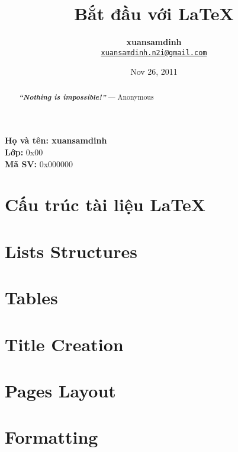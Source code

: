 \documentclass[11pt,a4paper]{article}
\title{\textbf{\huge{Bắt đầu với \LaTeX}}}
\author{\textbf{xuansamdinh}\\
\texttt{\underline{xuansamdinh.n2i@gmail.com}}}
\date{Nov 26, 2011}
\begin{document}
\maketitle
\begin{flushleft}
	\textbf{Họ và tên: xuansamdinh}\\
	\textbf{Lớp:} 0x00\\
	\textbf{Mã SV:} 0x000000
\end{flushleft}
\pagebreak
\renewcommand{\abstractname}{--- Philosophy ---}
\begin{abstract}
\begin{center}
\textbf{\emph{``Nothing is impossible!''}} --- Anonymous
\end{center}
\end{abstract}
\pagebreak
\renewcommand{\contentsname}{\underline{NỘI DUNG}}
\tableofcontents
\listoftables
\pagebreak


\newpage
\part{Cấu trúc tài liệu \LaTeX{}}



\newpage


\part{Lists Structures}
%

\newpage

\part{Tables}


\newpage

\part{Title Creation}


\newpage

\part{Pages Layout}


\newpage

\part{Formatting}
%

\newpage
{}

\nocite{*}
%

\end{document}
